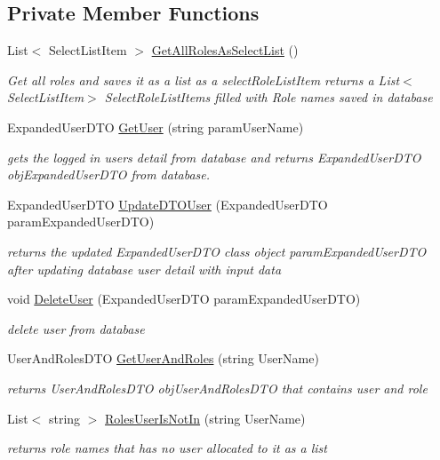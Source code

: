 \subsection*{Private Member Functions}
\begin{DoxyCompactItemize}
\item 
List$<$ Select\+List\+Item $>$ \hyperlink{class_alfa_accounting_1_1_controllers_1_1_admin_controller_a03803020e0e8f8234efe548a440dfb73}{Get\+All\+Roles\+As\+Select\+List} ()
\begin{DoxyCompactList}\small\item\em Get all roles and saves it as a list as a select\+Role\+List\+Item returns a List$<$\+Select\+List\+Item$>$ Select\+Role\+List\+Items filled with Role names saved in database \end{DoxyCompactList}\item 
Expanded\+User\+D\+TO \hyperlink{class_alfa_accounting_1_1_controllers_1_1_admin_controller_a28a65a7e1ec9bcff2726efd067ac96a7}{Get\+User} (string param\+User\+Name)
\begin{DoxyCompactList}\small\item\em gets the logged in user\textquotesingle{}s detail from database and returns Expanded\+User\+D\+TO obj\+Expanded\+User\+D\+TO from database. \end{DoxyCompactList}\item 
Expanded\+User\+D\+TO \hyperlink{class_alfa_accounting_1_1_controllers_1_1_admin_controller_acc3ea39bdbcb2412a2ad2d1d6c46c9e7}{Update\+D\+T\+O\+User} (Expanded\+User\+D\+TO param\+Expanded\+User\+D\+TO)
\begin{DoxyCompactList}\small\item\em returns the updated Expanded\+User\+D\+TO class object param\+Expanded\+User\+D\+TO after updating database user detail with input data \end{DoxyCompactList}\item 
void \hyperlink{class_alfa_accounting_1_1_controllers_1_1_admin_controller_a655bceb6a08f850821d527726e8412e1}{Delete\+User} (Expanded\+User\+D\+TO param\+Expanded\+User\+D\+TO)
\begin{DoxyCompactList}\small\item\em delete user from database \end{DoxyCompactList}\item 
User\+And\+Roles\+D\+TO \hyperlink{class_alfa_accounting_1_1_controllers_1_1_admin_controller_a29957ccd465eb001f6964bce6ddbcfff}{Get\+User\+And\+Roles} (string User\+Name)
\begin{DoxyCompactList}\small\item\em returns User\+And\+Roles\+D\+TO obj\+User\+And\+Roles\+D\+TO that contains user and role \end{DoxyCompactList}\item 
List$<$ string $>$ \hyperlink{class_alfa_accounting_1_1_controllers_1_1_admin_controller_a16b3d517afd4ab2e92aa4d47fa0b2f42}{Roles\+User\+Is\+Not\+In} (string User\+Name)
\begin{DoxyCompactList}\small\item\em returns role names that has no user allocated to it as a list \end{DoxyCompactList}\end{DoxyCompactItemize}
